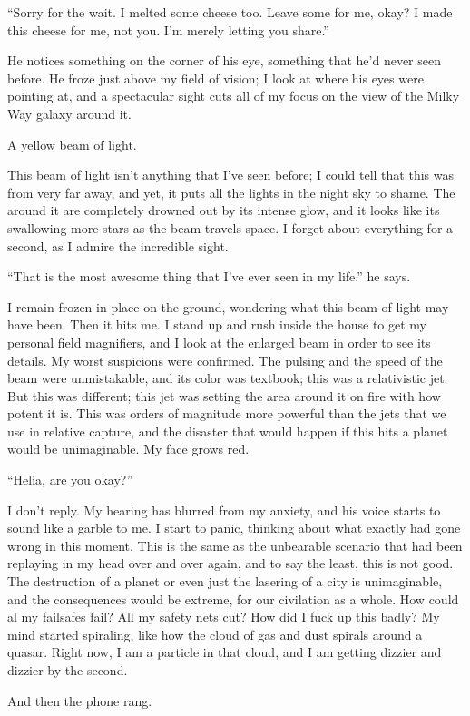 \documentclass{book}
\begin{document}
			``Sorry for the wait. I melted some cheese too. Leave some for me, okay? I made this
			cheese for me, not you. I'm merely letting you share.''

			He notices something on the corner of his eye, something that he'd never seen before.
			He froze just above my field of vision; I look at where his eyes were pointing at, and
			a spectacular sight cuts all of my focus on the view of the Milky Way galaxy around it.

			A yellow beam of light.

			This beam of light isn't anything that I've seen before; I could tell that this was from
			very far away, and yet, it puts all the lights in the night sky to shame. The around it
			are completely drowned out by its intense glow, and it looks like its swallowing more
			stars as the beam travels space. I forget about everything for a second, as I admire the
			incredible sight.

			``That is the most awesome thing that I've ever seen in my life.'' he says.

			I remain frozen in place on the ground, wondering what this beam of light may have been.
			Then it hits me. I stand up and rush inside the house to get my personal field magnifiers,
			and I look at the enlarged beam in order to see its details. My worst suspicions were
			confirmed. The pulsing and the speed of the beam were unmistakable, and its color was
			textbook; this was a relativistic jet. But this was different; this jet was setting the
			area around it on fire with how potent it is. This was orders of magnitude more powerful
			than the jets that we use in relative capture, and the disaster that would happen if this
			hits a planet would be unimaginable. My face grows red.

			``Helia, are you okay?''

			I don't reply. My hearing has blurred from my anxiety, and his voice starts to sound like
			a garble to me. I start to panic, thinking about what exactly had gone wrong in this moment.
			This is the same as the unbearable scenario that had been replaying in my head over and over again,
			and to say the least, this is not good. The destruction of a planet or even just the lasering of a
			city is unimaginable, and the consequences would be extreme, for our civilation as a whole. How
			could al my failsafes fail? All my safety nets cut? How did I fuck up this badly? My mind
			started spiraling, like how the cloud of gas and dust spirals around a quasar. Right now, I am
			a particle in that cloud, and I am getting dizzier and dizzier by the second.

			And then the phone rang.
\end{document}
